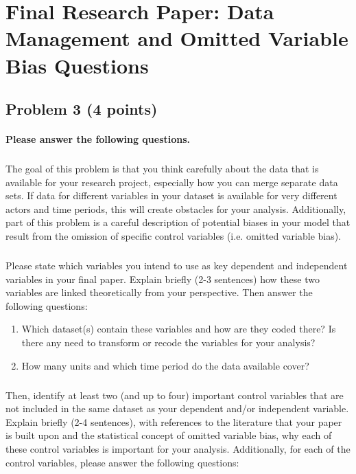 \documentclass[12pt]{article}
\begin{document}
\section*{Final Research Paper: Data Management and Omitted Variable Bias Questions}

\subsection*{Problem 3 (4 points)}

\paragraph{Please answer the following questions.}

\subparagraph{} The goal of this problem is that you think carefully about the data that is available for your research project, especially how you can merge separate data sets. If data for different variables in your dataset is available for very different actors and time periods, this will create obstacles for your analysis. Additionally, part of this problem is a careful description of potential biases in your model that result from the omission of specific control variables (i.e. omitted variable bias).

\subparagraph{} Please state which variables you intend to use as key dependent and independent variables in your final paper. Explain briefly (2-3 sentences) how these two variables are linked theoretically from your perspective. Then answer the following questions:

\begin{enumerate}
	\item Which dataset(s) contain these variables and how are they coded there? Is there any need to transform or recode the variables for your analysis?
	\item How many units and which time period do the data available cover?
\end{enumerate}

\subparagraph{} Then, identify at least two (and up to four) important control variables that are not included in the same dataset as your dependent and/or independent variable. Explain briefly (2-4 sentences), with references to the literature that your paper is built upon and the statistical concept of omitted variable bias, why each of these control variables is important for your analysis. Additionally, for each of the control variables, please answer the following questions:
\end{document}
